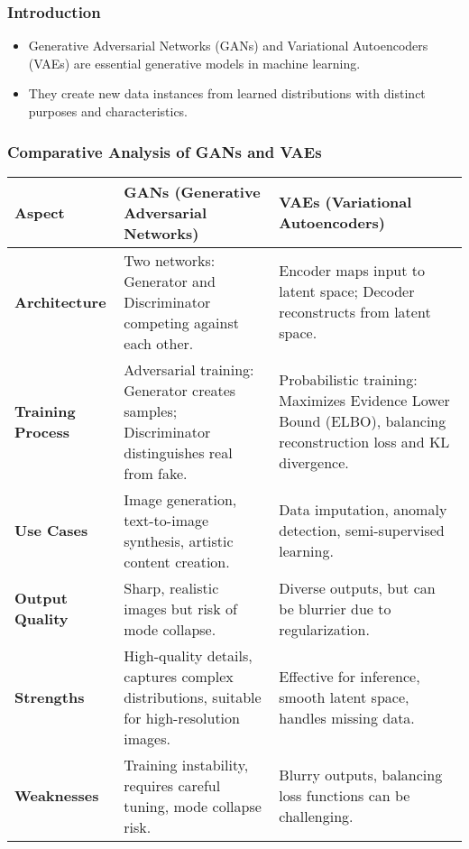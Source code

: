 \documentclass[aspectratio=169]{beamer}
\begin{document}
\begin{frame}[fragile]
    \frametitle{Introduction}
    \begin{itemize}
        \item Generative Adversarial Networks (GANs) and Variational Autoencoders (VAEs) are essential generative models in machine learning.
        \item They create new data instances from learned distributions with distinct purposes and characteristics.
    \end{itemize}
\end{frame}

\begin{frame}[fragile]
    \frametitle{Comparative Analysis of GANs and VAEs}
    \begin{table}[ht]
        \centering
        \begin{tabular}{| l | l | l |}
            \hline
            \textbf{Aspect} & \textbf{GANs (Generative Adversarial Networks)} & \textbf{VAEs (Variational Autoencoders)} \\ \hline
            \textbf{Architecture} & Two networks: Generator and Discriminator competing against each other. & Encoder maps input to latent space; Decoder reconstructs from latent space. \\ \hline
            \textbf{Training Process} & Adversarial training: Generator creates samples; Discriminator distinguishes real from fake. & Probabilistic training: Maximizes Evidence Lower Bound (ELBO), balancing reconstruction loss and KL divergence. \\ \hline
            \textbf{Use Cases} & Image generation, text-to-image synthesis, artistic content creation. & Data imputation, anomaly detection, semi-supervised learning. \\ \hline
            \textbf{Output Quality} & Sharp, realistic images but risk of mode collapse. & Diverse outputs, but can be blurrier due to regularization. \\ \hline
            \textbf{Strengths} & High-quality details, captures complex distributions, suitable for high-resolution images. & Effective for inference, smooth latent space, handles missing data. \\ \hline
            \textbf{Weaknesses} & Training instability, requires careful tuning, mode collapse risk. & Blurry outputs, balancing loss functions can be challenging. \\ \hline
        \end{tabular}
    \end{table}
\end{frame}
\end{document}
